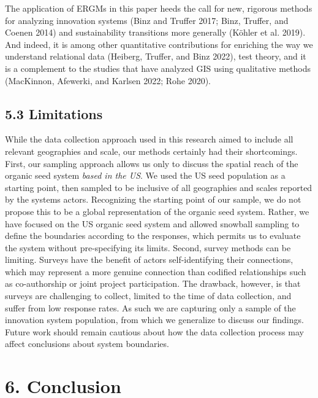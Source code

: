 \documentclass[twoside,12pt,final]{ucthesis-CA2012}
\begin{document}
\begin{ucmainmatter}
The application of ERGMs in this paper heeds the call for new, rigorous
methods for analyzing innovation systems (Binz and Truffer 2017; Binz,
Truffer, and Coenen 2014)
and sustainability transitions more generally (Köhler et al.
2019). And indeed, it is
among other quantitative contributions for enriching the way we
understand relational data (Heiberg, Truffer, and Binz
2022), test theory, and it
is a complement to the studies that have analyzed GIS using qualitative
methods (MacKinnon, Afewerki, and Karlsen 2022; Rohe
2020).

\hypertarget{limitations}{%
\subsection{5.3 Limitations}\label{limitations}}

While the data collection approach used in this research aimed to
include all relevant geographies and scale, our methods certainly had
their shortcomings. First, our sampling approach allows us only to
discuss the spatial reach of the organic seed system \emph{based in the US}.
We used the US seed population as a starting point, then sampled to be
inclusive of all geographies and scales reported by the system\textquotesingle s
actors. Recognizing the starting point of our sample, we do not propose
this to be a global representation of the organic seed system. Rather,
we have focused on the US organic seed system and allowed snowball
sampling to define the boundaries according to the responses, which
permits us to evaluate the system without pre-specifying its limits.
Second, survey methods can be limiting. Surveys have the benefit of
actors self-identifying their connections, which may represent a more
genuine connection than codified relationships such as co-authorship or
joint project participation. The drawback, however, is that surveys are
challenging to collect, limited to the time of data collection, and
suffer from low response rates. As such we are capturing only a sample
of the innovation system population, from which we generalize to discuss
our findings. Future work should remain cautious about how the data
collection process may affect conclusions about system boundaries.

\hypertarget{conclusion}{%
\section{6. Conclusion}\label{conclusion}}


\end{ucmainmatter}
\end{document}

